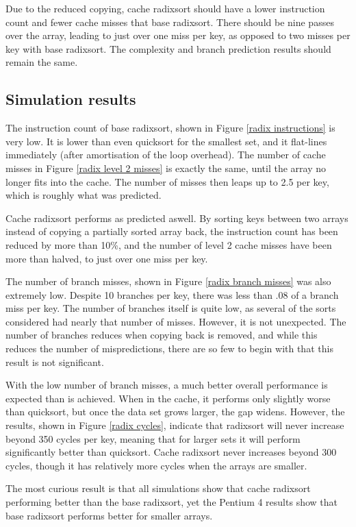 Due to the reduced copying, cache radixsort should have a lower instruction
count and fewer cache misses that base radixsort. There should be nine passes
over the array, leading to just over one miss per key, as opposed to two misses
per key with base radixsort. The complexity and branch prediction results
should remain the same.

\subsection{Simulation results}

The instruction count of base radixsort, shown in Figure \ref{radix instructions} is
very low. It is lower than even quicksort for the smallest set, and it
flat-lines immediately (after amortisation of the loop overhead). The number of
cache misses in Figure \ref{radix level 2 misses} is exactly the same, until
the array no longer fits into the cache. The number of misses then leaps up to
2.5 per key, which is roughly what was predicted.

Cache radixsort performs as predicted aswell. By sorting keys between two
arrays instead of copying a partially sorted array back, the instruction count
has been reduced by more than 10\%, and the number of level 2 cache misses
have been more than halved, to just over one miss per key.

The number of branch misses, shown in Figure \ref{radix branch misses} was also
extremely low. Despite 10 branches per key, there was less than .08 of a branch
miss per key. The number of branches itself is quite low, as several of the
sorts considered had nearly that number of misses. However, it is not
unexpected. The number of branches reduces when copying back is removed, and
while this reduces the number of mispredictions, there are so few to begin with
that this result is not significant.

With the low number of branch misses, a much better overall performance is
expected than is achieved. When in the cache, it performs only slightly worse
than quicksort, but once the data set grows larger, the gap widens.  However,
the results, shown in Figure \ref{radix cycles}, indicate that radixsort will
never increase beyond 350 cycles per key, meaning that for larger sets it will
perform significantly better than quicksort. Cache radixsort never increases
beyond 300 cycles, though it has relatively more cycles when the arrays are
smaller. 

The most curious result is that all simulations show that cache radixsort
performing better than the base radixsort, yet the Pentium 4 results show that
base radixsort performs better for smaller arrays.

